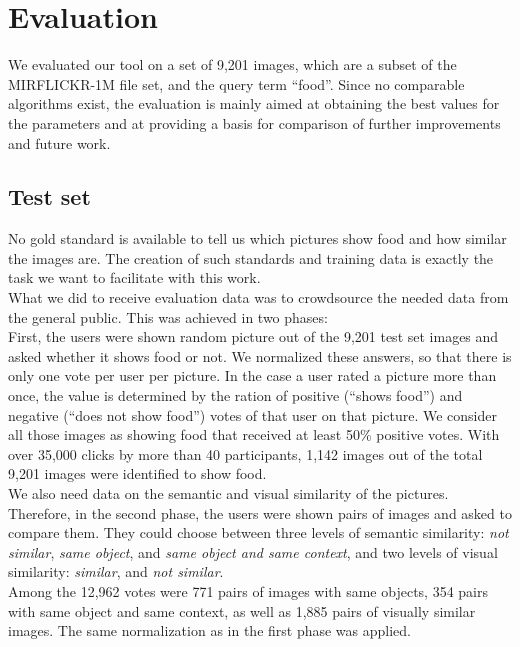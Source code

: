 %
\section{Evaluation}
\label{sec_evaluation}

We evaluated our tool on a set of 9,201 images, which are a subset of the MIRFLICKR-1M  file set, and the query term ``food''. Since no comparable algorithms exist, the evaluation is mainly aimed at obtaining the best values for the parameters and at providing a basis for comparison of further improvements and future work.

\subsection{Test set}
\label{sec_testset}
No gold standard is available to tell us which pictures show food and how similar the images are. The creation of such standards and training data is exactly the task we want to facilitate with this work.\\ 
What we did to receive evaluation data was to crowdsource the needed data from the general public. This was achieved in two phases:\\

First, the users were shown random picture out of the 9,201 test set images and asked whether it shows food or not. We normalized these answers, so that there is only one vote per user per picture. In the case a user rated a picture more than once, the value is determined by the ration of positive (``shows food'') and negative (``does not show food'') votes of that user on that picture. We consider all those images as showing food that received at least 50\% positive votes. With over 35,000 clicks by more than 40 participants, 1,142 images out of the total 9,201 images were identified to show food. \\

We also need data on the semantic and visual similarity of the pictures. Therefore, in the second phase, the users were shown pairs of images and asked to compare them. They could choose between three levels of semantic similarity: \emph{not similar}, \emph{same object}, and \emph{same object and same context}, and two levels of visual similarity: \emph{similar}, and \emph{not similar}.\\
Among the 12,962 votes were 771 pairs of images with same objects, 354 pairs with same object and same context, as well as 1,885 pairs of visually similar images. The same normalization as in the first phase was applied.

